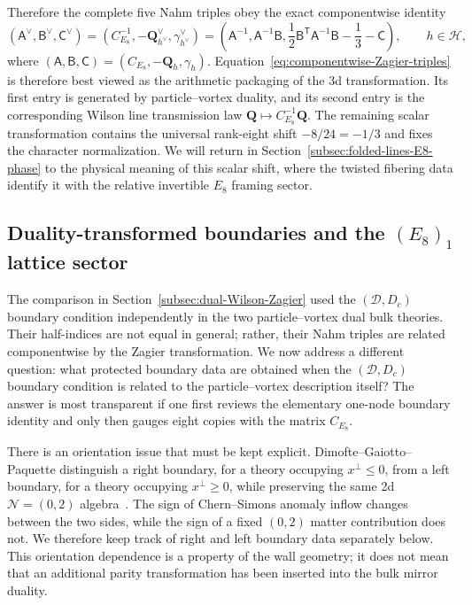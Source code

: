 \documentclass[11pt,a4paper]{article}
\numberwithin{equation}{section}
\begin{document}
Therefore the complete five Nahm triples obey the exact componentwise identity
\begin{equation}
  (\mathsf A^\vee,\mathsf B^\vee,\mathsf C^\vee)
  =
  \left(
  C_{E_8}^{-1},
  -\boldsymbol Q_{h^\vee}^\vee,
  \gamma_{h^\vee}^\vee
  \right)
  =
  \left(
  \mathsf A^{-1},
  \mathsf A^{-1}\mathsf B,
  \frac12\mathsf B^{\mathsf T}\mathsf A^{-1}\mathsf B
  -\frac13-\mathsf C
  \right),
  \qquad
  h\in\mathcal H,
  \label{eq:componentwise-Zagier-triples}
\end{equation}
where $(\mathsf A,\mathsf B,\mathsf C)=(C_{E_8},-\boldsymbol Q_h,\gamma_h)$.  Equation~\eqref{eq:componentwise-Zagier-triples} is therefore best viewed as the arithmetic packaging of the 3d transformation.  Its first entry is generated by particle--vortex duality, and its second entry is the corresponding Wilson line transmission law $\boldsymbol Q\mapsto C_{E_8}^{-1}\boldsymbol Q$.  The remaining scalar transformation contains the universal rank-eight shift $-8/24=-1/3$ and fixes the character normalization.  We will return in Section~\ref{subsec:folded-lines-E8-phase} to the physical meaning of this scalar shift, where the twisted fibering data identify it with the relative invertible $E_8$ framing sector.


\subsection{Duality-transformed boundaries and the $(E_8)_1$ lattice sector}
\label{subsec:mirror-boundary-half-index}

The comparison in Section~\ref{subsec:dual-Wilson-Zagier} used the $(\mathcal D,D_c)$ boundary condition independently in the two particle--vortex dual bulk theories.  Their half-indices are not equal in general; rather, their Nahm triples are related componentwise by the Zagier transformation.  We now address a different question: what protected boundary data are obtained when the $(\mathcal D,D_c)$ boundary condition is related to the particle--vortex description itself?  The answer is most transparent if one first reviews the elementary one-node boundary identity and only then gauges eight copies with the matrix $C_{E_8}$.

There is an orientation issue that must be kept explicit.  Dimofte--Gaiotto--Paquette distinguish a right boundary, for a theory occupying $x^\perp\leq0$, from a left boundary, for a theory occupying $x^\perp\geq0$, while preserving the same 2d $\mathcal N=(0,2)$ algebra~\cite{Dimofte:2017tpi}.  The sign of Chern--Simons anomaly inflow changes between the two sides, while the sign of a fixed $(0,2)$ matter contribution does not.  We therefore keep track of right and left boundary data separately below.  This orientation dependence is a property of the wall geometry; it does not mean that an additional parity transformation has been inserted into the bulk mirror duality.
\end{document}
